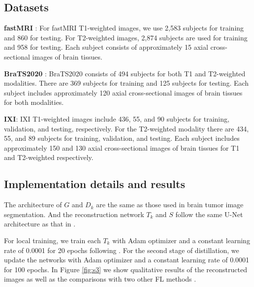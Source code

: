 \documentclass[letterpaper]{article} %
\begin{document}
\subsection{Datasets}
\textbf{fastMRI} \cite{zbontar2018fastMRI}:  For fastMRI T1-weighted images, we use 2,583 subjects for training and 860 for testing. For T2-weighted images, 2,874 subjects are used for training and 958 for testing. Each subject consists of approximately 15 axial cross-sectional images of brain tissues.

\noindent \textbf{BraTS2020} \cite{hdtd-5j88-20}: BraTS2020 consists of 494 subjects for both  T1 and T2-weighted modalities. There are 369 subjects for training and 125 subjects for testing. Each subject includes approximately 120 axial cross-sectional images of brain tissues for both modalities.

\noindent \textbf{IXI}:
IXI T1-weighted images include 436, 55, and 90 subjects for training, validation, and testing, respectively.
For the T2-weighted modality there are 434, 55, and 89 subjects for training, validation, and testing.  Each subject includes approximately 150 and 130 axial cross-sectional images of brain tissues for T1 and T2-weighted respectively.

\subsection{Implementation details and results}
The architecture of $G$ and $D_k$ are the same as those used in brain tumor image segmentation. And the reconstruction network $T_k$ and $S$ follow the same U-Net architecture as that in \cite{Guo_2021_CVPR}.

For local training, we train each $T_k$ with Adam optimizer and a constant learning rate of 0.0001 for 20 epochs following \cite{gong2022federated}.
For the second stage of distillation, we update the networks with Adam optimizer and a constant learning rate of 0.0001 for 100 epochs. In Figure \ref{fig:s3} we show qualitative results of the reconstructed images as well as the comparisons with two other FL methods  \cite{mcmahan2017communication, Guo_2021_CVPR}.
\end{document}
